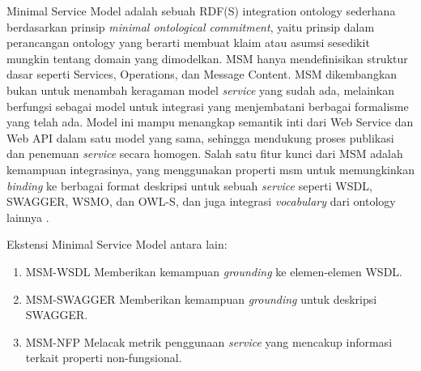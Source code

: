Minimal Service Model adalah sebuah RDF(S) integration ontology sederhana berdasarkan prinsip \textit{minimal ontological commitment}, yaitu prinsip dalam perancangan ontology yang berarti membuat klaim atau asumsi sesedikit mungkin tentang domain yang dimodelkan. MSM hanya mendefinisikan struktur dasar seperti Services, Operations, dan Message Content. MSM dikembangkan bukan untuk menambah keragaman model \textit{service} yang sudah ada, melainkan berfungsi sebagai model untuk integrasi yang menjembatani berbagai formalisme yang telah ada. Model ini mampu menangkap semantik inti dari Web Service dan Web API dalam satu model yang sama, sehingga mendukung proses publikasi dan penemuan \textit{service} secara homogen. Salah satu fitur kunci dari MSM adalah kemampuan integrasinya, yang menggunakan properti msm untuk memungkinkan \textit{binding} ke berbagai format deskripsi untuk sebuah \textit{service} seperti WSDL, SWAGGER, WSMO, dan OWL-S, dan juga integrasi \textit{vocabulary} dari ontology lainnya \parencite{iserve2015datamodel}.

Ekstensi Minimal Service Model antara lain:
\begin{enumerate}
  \item MSM-WSDL \break Memberikan kemampuan \textit{grounding} ke elemen-elemen WSDL.
  \item MSM-SWAGGER \break Memberikan kemampuan \textit{grounding} untuk deskripsi SWAGGER.
  \item MSM-NFP \break Melacak metrik penggunaan \textit{service} yang mencakup informasi terkait properti non-fungsional.
\end{enumerate}